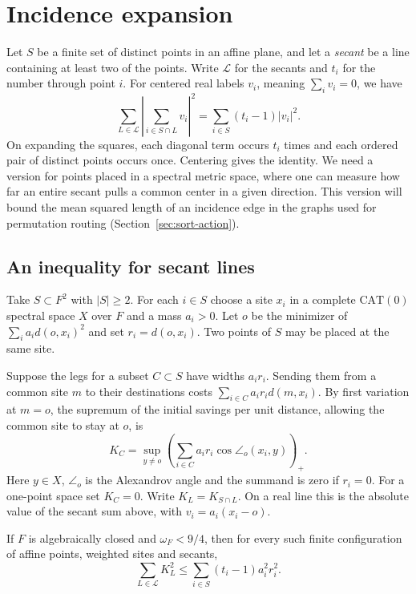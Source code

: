 \section{Incidence expansion}\label{sec:incidence}

Let $S$ be a finite set of distinct points in an affine plane, and let a
\emph{secant} be a line containing at least two of the points. Write
$\mathcal L$ for the secants and $t_i$ for the number through point $i$.
For centered real labels $v_i$, meaning $\sum_i v_i=0$, we have
\[
 \sum_{L\in\mathcal L}\left|\sum_{i\in S\cap L}v_i\right|^2
       =\sum_{i\in S}(t_i-1)|v_i|^2 .
\]
On expanding the squares, each diagonal term occurs $t_i$ times and
each ordered pair of distinct points occurs once. Centering gives the
identity. We need a version for points placed in a spectral metric space,
where one can measure how far an entire secant pulls a common center
in a given direction. This version will bound the mean squared length
of an incidence edge in the graphs used for permutation routing
(Section~\ref{sec:sort-action}).

\subsection{An inequality for secant lines}

Take $S\subset F^2$ with $|S|\ge2$. For each $i\in S$ choose a site
$x_i$ in a complete $\mathrm{CAT}(0)$ spectral space $X$ over $F$
and a mass $a_i>0$. Let $o$ be the minimizer of
$\sum_i a_i d(o,x_i)^2$ and set $r_i=d(o,x_i)$. Two points of $S$
may be placed at the same site.

Suppose the legs for a subset $C\subset S$ have widths $a_i r_i$.
Sending them from a common site $m$ to their destinations costs
$\sum_{i\in C}a_i r_i d(m,x_i)$. By first variation at $m=o$, the
supremum of the initial savings per unit distance, allowing the common
site to stay at $o$, is
\[
 K_C=\sup_{y\ne o}
       \left(\sum_{i\in C}a_i r_i\cos\angle_o(x_i,y)\right)_+ .
\]
Here $y\in X$, $\angle_o$ is the Alexandrov angle and the summand is
zero if $r_i=0$. For a one-point space set $K_C=0$.
Write $K_L=K_{S\cap L}$. On a real line this is the absolute value of
the secant sum above, with $v_i=a_i(x_i-o)$.

\begin{theorem}\label{thm:incidence}
If $F$ is algebraically closed and $\omega_F<9/4$, then for every
such finite configuration of affine points, weighted sites and secants,
\begin{equation}\label{eq:inc-secants}
       \sum_{L\in\mathcal L}K_L^2
          \le \sum_{i\in S}(t_i-1)a_i^2r_i^2 .
\end{equation}
\end{theorem}

